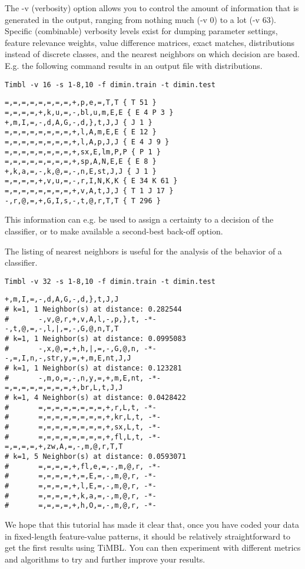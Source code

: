 \documentclass{report}
\begin{document}
The {\sc -v} (verbosity) option allows you to control the amount of
information that is generated in the output, ranging from nothing much
({\sc -v 0}) to a lot ({\sc -v 63}). Specific (combinable) verbosity
levels exist for dumping parameter settings, feature relevance
weights, value difference matrices, exact matches, distributions instead
of discrete classes, and the nearest neighbors on which decision are
based. E.g. the following command results in an output file with
distributions. 

{\small
\begin{verbatim}
Timbl -v 16 -s 1-8,10 -f dimin.train -t dimin.test
\end{verbatim}
}

{\small
\begin{verbatim}
=,=,=,=,=,=,=,=,+,p,e,=,T,T { T 51 }
=,=,=,=,+,k,u,=,-,bl,u,m,E,E { E 4 P 3 }
+,m,I,=,-,d,A,G,-,d,},t,J,J { J 1 }
=,=,=,=,=,=,=,=,+,l,A,m,E,E { E 12 }
=,=,=,=,=,=,=,=,+,l,A,p,J,J { E 4 J 9 }
=,=,=,=,=,=,=,=,+,sx,E,lm,P,P { P 1 }
=,=,=,=,=,=,=,=,+,sp,A,N,E,E { E 8 }
+,k,a,=,-,k,@,=,-,n,E,st,J,J { J 1 }
=,=,=,=,+,v,u,=,-,r,I,N,K,K { E 34 K 61 }
=,=,=,=,=,=,=,=,+,v,A,t,J,J { T 1 J 17 }
-,r,@,=,+,G,I,s,-,t,@,r,T,T { T 296 }
\end{verbatim}
}

This information can e.g. be used to assign a certainty to a decision
of the classifier, or to make available a second-best back-off option.

The listing of nearest neighbors is useful for the analysis of the
behavior of a classifier.

{\small
\begin{verbatim}
Timbl -v 32 -s 1-8,10 -f dimin.train -t dimin.test
\end{verbatim}
}

{\small
\begin{verbatim}
+,m,I,=,-,d,A,G,-,d,},t,J,J
# k=1, 1 Neighbor(s) at distance: 0.282544
#       -,v,@,r,+,v,A,l,-,p,},t, -*-
-,t,@,=,-,l,|,=,-,G,@,n,T,T
# k=1, 1 Neighbor(s) at distance: 0.0995083
#       -,x,@,=,+,h,|,=,-,G,@,n, -*-
-,=,I,n,-,str,y,=,+,m,E,nt,J,J
# k=1, 1 Neighbor(s) at distance: 0.123281
#       -,m,o,=,-,n,y,=,+,m,E,nt, -*-
=,=,=,=,=,=,=,=,+,br,L,t,J,J
# k=1, 4 Neighbor(s) at distance: 0.0428422
#       =,=,=,=,=,=,=,=,+,r,L,t, -*-
#       =,=,=,=,=,=,=,=,+,kr,L,t, -*-
#       =,=,=,=,=,=,=,=,+,sx,L,t, -*-
#       =,=,=,=,=,=,=,=,+,fl,L,t, -*-
=,=,=,=,+,zw,A,=,-,m,@,r,T,T
# k=1, 5 Neighbor(s) at distance: 0.0593071
#       =,=,=,=,+,fl,e,=,-,m,@,r, -*-
#       =,=,=,=,+,=,E,=,-,m,@,r, -*-
#       =,=,=,=,+,l,E,=,-,m,@,r, -*-
#       =,=,=,=,+,k,a,=,-,m,@,r, -*-
#       =,=,=,=,+,h,O,=,-,m,@,r, -*-
\end{verbatim}
}

We hope that this tutorial has made it clear that, once you have coded
your data in fixed-length feature-value patterns, it should be
relatively straightforward to get the first results using TiMBL. You
can then experiment with different metrics and algorithms to try and
further improve your results.
\end{document}
